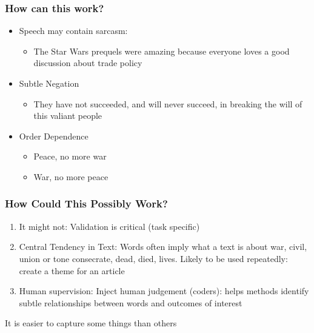 \documentclass[compress, aspectratio=54]{beamer}
\begin{document}

\begin{frame}
\frametitle{How can this work?}

\begin{itemize}
\item Speech may contain sarcasm:
\begin{itemize}

\item The Star Wars prequels were amazing because everyone
loves a good discussion about trade policy
\end{itemize}

\item Subtle Negation
\begin{itemize}

\item They have not succeeded, and will never succeed, in
breaking the will of this valiant people
\end{itemize}
\item Order Dependence
\begin{itemize}
\item Peace, no more war
\item War, no more peace
\end{itemize}
\end{itemize}
\end{frame}





\begin{frame}
\frametitle{How Could This Possibly Work?}

\begin{enumerate}
\item It might not: Validation is critical (task specific)

\item Central Tendency in Text: Words often imply what a text is about
war, civil, union or tone consecrate, dead, died, lives.
Likely to be used repeatedly: create a theme for an article

\item Human supervision: Inject human judgement (coders): helps methods
identify subtle relationships between words and outcomes of interest

\end{enumerate}
It is easier to capture some things than others
\end{frame}
\end{document}
